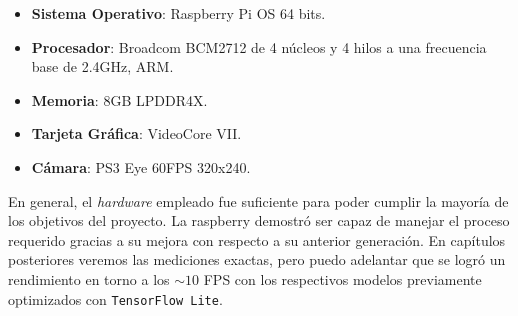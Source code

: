 \begin{itemize}
\tightlist
    \item \textbf{Sistema Operativo}: Raspberry Pi OS 64 bits.
    \item \textbf{Procesador}: Broadcom BCM2712 de 4 núcleos y 4 hilos a una frecuencia base de 2.4GHz, ARM.
    \item \textbf{Memoria}: 8GB LPDDR4X.
    \item \textbf{Tarjeta Gráfica}: VideoCore VII.
    \item \textbf{Cámara}: PS3 Eye 60FPS 320x240.
\end{itemize}



En general, el \textit{hardware} empleado fue suficiente para poder cumplir la mayoría de los objetivos del proyecto. La raspberry demostró ser capaz de manejar el proceso requerido gracias a su mejora con respecto a su anterior generación. En capítulos posteriores veremos las mediciones exactas, pero puedo adelantar que se logró un rendimiento en torno a los $\sim 10$ FPS con los respectivos modelos previamente optimizados con \texttt{TensorFlow Lite}.